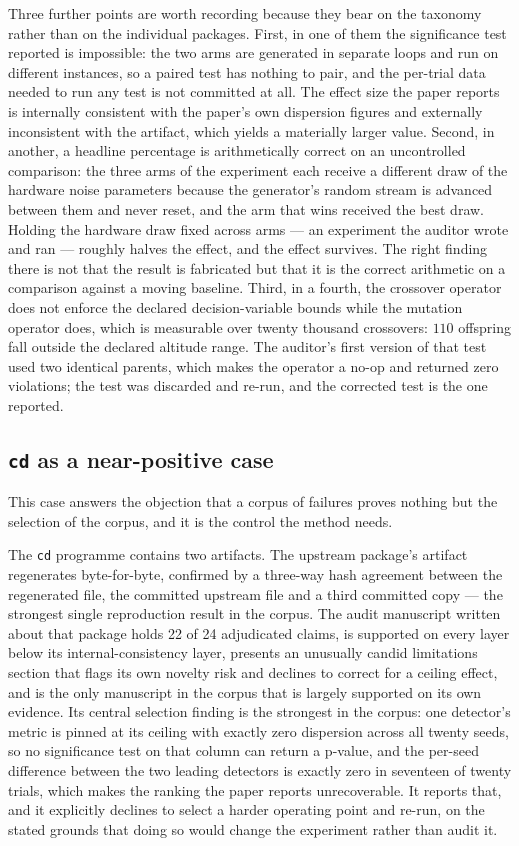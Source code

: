 \documentclass[sigconf,review]{acmart}
\newcommand{\pkg}[1]{\texttt{#1}}
\begin{document}
Three further points are worth recording because they bear on the taxonomy
rather than on the individual packages. First, in one of them the
significance test reported is impossible: the two arms are generated in
separate loops and run on different instances, so a paired test has nothing
to pair, and the per-trial data needed to run any test is not committed at
all. The effect size the paper reports is internally consistent with the
paper's own dispersion figures and externally inconsistent with the artifact,
which yields a materially larger value. Second, in another, a headline
percentage is arithmetically correct on an uncontrolled comparison: the three
arms of the experiment each receive a different draw of the hardware noise
parameters because the generator's random stream is advanced between them and
never reset, and the arm that wins received the best draw. Holding the
hardware draw fixed across arms --- an experiment the auditor wrote and ran ---
roughly halves the effect, and the effect survives. The right finding there is
not that the result is fabricated but that it is the correct arithmetic on a
comparison against a moving baseline. Third, in a fourth, the crossover
operator does not enforce the declared decision-variable bounds while the
mutation operator does, which is measurable over twenty thousand crossovers:
$110$ offspring fall outside the declared altitude range. The auditor's
first version of that test used two identical parents, which makes the
operator a no-op and returned zero violations; the test was discarded and
re-run, and the corrected test is the one reported.

\subsection{\pkg{cd} as a near-positive case}
\label{sec:case-cd}

This case answers the objection that a corpus of failures proves nothing but
the selection of the corpus, and it is the control the method needs.

The \pkg{cd} programme contains two artifacts. The upstream package's
artifact regenerates byte-for-byte, confirmed by a three-way hash agreement
between the regenerated file, the committed upstream file and a third
committed copy --- the strongest single reproduction result in the corpus.
The audit manuscript written about that package holds 22 of 24 adjudicated
claims, is supported on every layer below its internal-consistency layer,
presents an unusually candid limitations section that flags its own novelty
risk and declines to correct for a ceiling effect, and is the only manuscript
in the corpus that is largely supported on its own evidence. Its central
selection finding is the strongest in the corpus: one detector's metric is
pinned at its ceiling with exactly zero dispersion across all twenty seeds, so
no significance test on that column can return a p-value, and the per-seed
difference between the two leading detectors is exactly zero in seventeen of
twenty trials, which makes the ranking the paper reports unrecoverable. It
reports that, and it explicitly declines to select a harder operating point
and re-run, on the stated grounds that doing so would change the experiment
rather than audit it.
\end{document}
